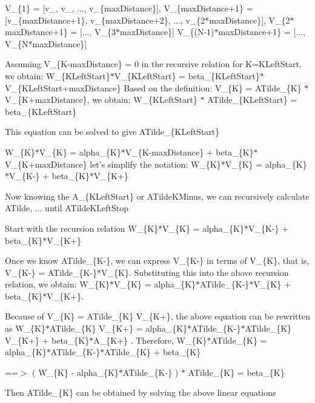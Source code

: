 V\_\-\{1\} = [v\_, v\_, ..., v\_\-\{max\-Distance\}], V\_\-\{max\-Distance+1\} = [v\_\-\{max\-Distance+1\}, v\_\-\{max\-Distance+2\}, ..., v\_\-\{2$\ast$max\-Distance\}], V\_\-\{2$\ast$max\-Distance+1\} = [..., V\_\-\{3$\ast$max\-Distance\}] V\_\-\{(N-1)$\ast$max\-Distance+1\} = [..., V\_\-\{N$\ast$max\-Distance\}]

Assuming V\_\-\{K-max\-Distance\} = 0 in the recursive relation for K=KLeft\-Start, we obtain: W\_\-\{KLeft\-Start\}$\ast$V\_\-\{KLeft\-Start\} = beta\_\-\{KLeft\-Start\}$\ast$V\_\-\{KLeft\-Start+max\-Distance\} Based on the definition: V\_\-\{K\} = ATilde\_\-\{K\} $\ast$ V\_\-\{K+max\-Distance\}, we obtain: W\_\-\{KLeft\-Start\} $\ast$ ATilde\_\-\{KLeft\-Start\} = beta\_\-\{KLeft\-Start\}

This equation can be solved to give ATilde\_\-\{KLeft\-Start\}

W\_\-\{K\}$\ast$V\_\-\{K\} = alpha\_\-\{K\}$\ast$V\_\-\{K-max\-Distance\} + beta\_\-\{K\}$\ast$V\_\-\{K+max\-Distance\} let's simplify the notation: W\_\-\{K\}$\ast$V\_\-\{K\} = alpha\_\-\{K\}$\ast$V\_\-\{K-\} + beta\_\-\{K\}$\ast$V\_\-\{K+\}

Now knowing the A\_\-\{KLeft\-Start\} or ATilde\-KMinus, we can recursively calculate ATilde, ... until ATilde\-KLeft\-Stop

Start with the recursion relation W\_\-\{K\}$\ast$V\_\-\{K\} = alpha\_\-\{K\}$\ast$V\_\-\{K-\} + beta\_\-\{K\}$\ast$V\_\-\{K+\}

Once we know ATilde\_\-\{K-\}, we can express V\_\-\{K-\} in terms of V\_\-\{K\}, that is, V\_\-\{K-\} = ATilde\_\-\{K-\}$\ast$V\_\-\{K\}. Substituting this into the above recursion relation, we obtain: W\_\-\{K\}$\ast$V\_\-\{K\} = alpha\_\-\{K\}$\ast$ATilde\_\-\{K-\}$\ast$V\_\-\{K\} + beta\_\-\{K\}$\ast$V\_\-\{K+\}.

Because of V\_\-\{K\} = ATilde\_\-\{K\} V\_\-\{K+\}, the above equation can be rewritten as W\_\-\{K\}$\ast$ATilde\_\-\{K\} V\_\-\{K+\} = alpha\_\-\{K\}$\ast$ATilde\_\-\{K-\}$\ast$ATilde\_\-\{K\} V\_\-\{K+\} + beta\_\-\{K\}$\ast$A\_\-\{K+\} . Therefore, W\_\-\{K\}$\ast$ATilde\_\-\{K\} = alpha\_\-\{K\}$\ast$ATilde\_\-\{K-\}$\ast$ATilde\_\-\{K\} + beta\_\-\{K\}

==$>$ ( W\_\-\{K\} - alpha\_\-\{K\}$\ast$ATilde\_\-\{K-\} ) $\ast$ ATilde\_\-\{K\} = beta\_\-\{K\}

Then ATilde\_\-\{K\} can be obtained by solving the above linear equations 
